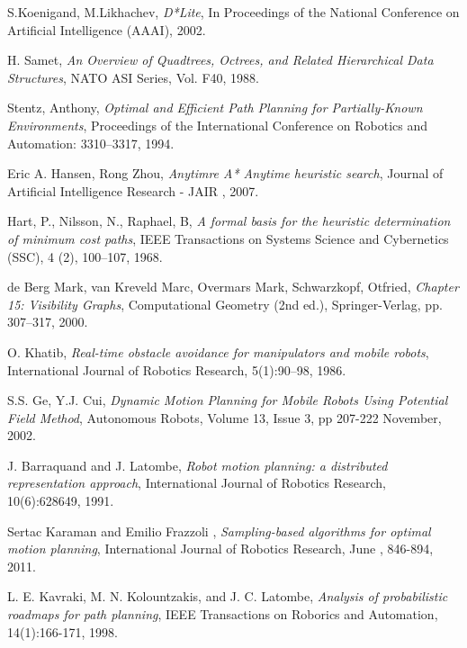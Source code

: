 \documentclass[MTech]{iitmdiss}
\begin{document}
\begin{thebibliography}{99}
	S.Koenigand, M.Likhachev,
  \emph{D*Lite},
	 In Proceedings of the National Conference on Artificial Intelligence (AAAI),
	 2002.

	H. Samet,
  \emph{An Overview of Quadtrees, Octrees, and Related Hierarchical
Data Structures},
	 NATO ASI Series, Vol. F40,
	 1988.
	 
	Stentz, Anthony,
  \emph{Optimal and Efficient Path Planning for Partially-Known Environments},
	Proceedings of the International Conference on Robotics and Automation: 3310–3317,
	 1994.
	 
	 
	Eric A. Hansen, Rong Zhou,
  \emph{Anytimre A* Anytime heuristic search},
	 Journal of Artificial Intelligence Research - JAIR ,
	 2007.
	 
	Hart, P., Nilsson, N., Raphael, B,
  \emph{A formal basis for the heuristic determination of
minimum cost paths},
	 IEEE Transactions on Systems Science and Cybernetics (SSC),
4 (2), 100–107,
	 1968.	 
	 

	de Berg Mark, van Kreveld Marc, Overmars Mark, Schwarzkopf, Otfried,
  \emph{Chapter 15: Visibility Graphs},
	 Computational Geometry (2nd ed.), Springer-Verlag, pp. 307–317,
	 2000.	 
	 

	O. Khatib,
  \emph{Real-time obstacle avoidance for manipulators and mobile robots},
	 International Journal of Robotics Research, 5(1):90–98,
	 1986.	 



	S.S. Ge, Y.J. Cui,
  \emph{Dynamic Motion Planning for Mobile Robots Using Potential Field Method},
	Autonomous Robots, Volume 13, Issue 3, pp 207-222 November,
	 2002.	 

	J. Barraquand and J. Latombe,
  \emph{Robot motion planning: a distributed representation approach},
	International Journal of Robotics Research, 10(6):628649,
	1991.	 


	Sertac Karaman and Emilio Frazzoli ,
  \emph{Sampling-based algorithms for optimal motion planning},
	International Journal of Robotics Research, June , 846-894,
	2011.	 

	L. E. Kavraki, M. N. Kolountzakis, and J. C. Latombe,
  \emph{Analysis of probabilistic roadmaps for path planning},
	IEEE Transactions on Roborics and Automation, 14(1):166-171,
	1998.	 
	

\end{thebibliography}
\end{document}
